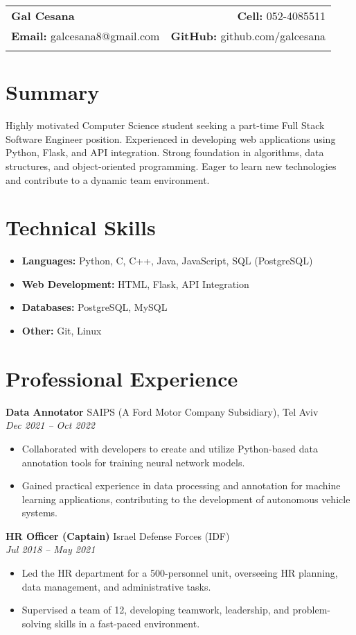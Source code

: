 \documentclass[a4paper,10pt]{article}
\makeatletter
\renewcommand{\maketitle}{
    \hspace{-1em}\begin{tabular*}{\textwidth}{l@{\extracolsep{\fill}}r}
        \textbf{\LARGE Gal Cesana} & \textbf{Cell:} 052-4085511 \\
        \textbf{Email:} galcesana8@gmail.com & \textbf{GitHub:} github.com/galcesana \\
         &  \\
    \end{tabular*}
    \vspace{1em}
}
\makeatother
\begin{document}
\maketitle

\section*{Summary}
Highly motivated Computer Science student seeking a part-time Full Stack Software Engineer position.  Experienced in developing web applications using Python, Flask, and API integration.  Strong foundation in algorithms, data structures, and object-oriented programming. Eager to learn new technologies and contribute to a dynamic team environment.

\section*{Technical Skills}
\begin{itemize}[noitemsep,nolistsep]
    \item \textbf{Languages:} Python, C, C++, Java, JavaScript, SQL (PostgreSQL)
    \item \textbf{Web Development:} HTML, Flask, API Integration
    \item \textbf{Databases:} PostgreSQL, MySQL
    \item \textbf{Other:} Git, Linux
\end{itemize}


\section*{Professional Experience}
\textbf{Data Annotator} \hfill SAIPS (A Ford Motor Company Subsidiary), Tel Aviv \\
\textit{Dec 2021 -- Oct 2022}
\begin{itemize}[noitemsep,nolistsep]
    \item Collaborated with developers to create and utilize Python-based data annotation tools for training neural network models.
    \item Gained practical experience in data processing and annotation for machine learning applications, contributing to the development of autonomous vehicle systems.
\end{itemize}

\textbf{HR Officer (Captain)} \hfill Israel Defense Forces (IDF) \\
\textit{Jul 2018 -- May 2021}
\begin{itemize}[noitemsep,nolistsep]
    \item Led the HR department for a 500-personnel unit, overseeing HR planning, data management, and administrative tasks.
    \item Supervised a team of 12, developing teamwork, leadership, and problem-solving skills in a fast-paced environment.
\end{itemize}
\end{document}
